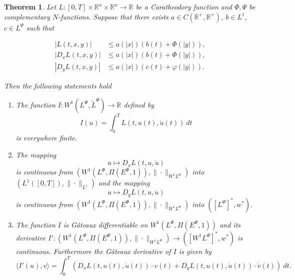 \documentclass[twoside]{article}
\newtheorem{thm}{Theorem}[section]
\newcommand{\lphi}{L^{\Phi}}
\newcommand{\lpsi}{L^{\Psi}}
\newcommand{\ephi}{E^{\Phi}}
\newcommand{\claseor}{\widetilde{L}^{\Phi}}
\newcommand{\wphi}{W^{1}\lphi}
\newcommand{\sobnor}{\|_{W^{1}\lphi}}
\newcommand{\domi}{W^{1}(\lphi,\Pi(\ephi,1))}
\begin{document}
\begin{thm}\label{teorema_acotacion}
Let $L:[0,T]\times \mathbb{R}^n \times \mathbb{R}^n \rightarrow \mathbb{R}$ be a Caratheodory function and $\Phi,\Psi$ be complementary  $N$-functions. Suppose that there
exists $a \in C(\mathbb{R}^+, \mathbb{R}^+)$, $b \in L^1$, $c \in \lpsi$ such that

\begin{eqnarray}
|L(t,x,y)| &\leq a(|x|)\left(b(t)+ \Phi(|y|)  \right),\label{cotaL}\\
|D_{x}L(t,x,y)| &\leq a(|x|)\left(b(t)+ \Phi(|y|)  \right),\label{cotaDxL}\\
|D_{y}L(t,x,y)| &\leq a(|x|)\left(c(t)+ \varphi(|y|)  \right).\label{cotaDyL}
\end{eqnarray}




Then the following statements hold
\begin{enumerate}
\item \label{T1item1} \label{A1} The function $I: W^{1}(\lphi,\claseor) \rightarrow \mathbb{R}$ defined by
\[
I(u)=\int_{0}^T L(t,u(t),\dot{u}(t))\ dt
\]
is everywhere finite.
\item\label{T1item2}  The mapping
\[
u \mapsto D_{x}L(t,u,\dot{u})
\]
is continuous from $\left(\domi, \|\cdot \sobnor\right)$ into $\left(L^{1}([0,T]), \|\cdot\|_{L^1}\right)$ and the mapping
\[
u \mapsto  D_{y}L(t,u,\dot{u})
\]
is continuous from $\left(\domi, \|\cdot \sobnor\right)$ into $\left(\left[\lphi\right]^*,w^*\right)$. %



\item\label{T1item3} The function  $I$ is G\^ateaux differentiable on $W^{1}(\lphi,\Pi(\ephi,1))$ and  its derivative
$I': \left(\domi, \|\cdot \sobnor\right) \to \left(\left[\wphi \right]^*, w^* \right)$ is continuous. Furthermore the G\^ateaux derivative of $I$ is given by
\[
\langle I'(u), v \rangle= \int_0^T \left(D_{x}L(t,u(t),\dot{u}(t))\cdot v(t)+ D_{y}L(t,u(t),\dot{u}(t))\cdot\dot{v}(t)\right) \ dt.
\]
\end{enumerate}
\end{thm}
\end{document}
